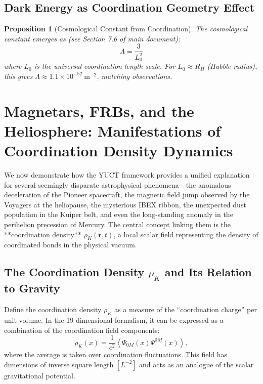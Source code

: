 \documentclass[12pt,a4paper]{article}
\newtheorem{proposition}[theorem]{Proposition}
\theoremstyle{remark}
\begin{document}
	\subsection{Dark Energy as Coordination Geometry Effect}
	
	\begin{proposition}[Cosmological Constant from Coordination]
		The cosmological constant emerges as (see Section 7.6 of main document):
		\[
		\Lambda = \frac{3}{L_0^2}
		\]
		where $L_0$ is the universal coordination length scale. For $L_0 \approx R_H$ (Hubble radius), this gives $\Lambda \approx 1.1 \times 10^{-52}\ \text{m}^{-2}$, matching observations.
	\end{proposition}
	
	\section{Magnetars, FRBs, and the Heliosphere: Manifestations of Coordination Density Dynamics}
	\label{sec:coord_density}
	
	We now demonstrate how the YUCT framework provides a unified explanation for several seemingly disparate astrophysical phenomena—the anomalous deceleration of the Pioneer spacecraft, the magnetic field jump observed by the Voyagers at the heliopause, the mysterious IBEX ribbon, the unexpected dust population in the Kuiper belt, and even the long-standing anomaly in the perihelion precession of Mercury. The central concept linking them is the **coordination density** \(\rho_K(\mathbf{r},t)\), a local scalar field representing the density of coordinated bonds in the physical vacuum.
	
	\subsection{The Coordination Density \(\rho_K\) and Its Relation to Gravity}
	\label{subsec:rho_K_definition}
	
	Define the coordination density \(\rho_K\) as a measure of the ``coordination charge'' per unit volume. In the 19-dimensional formalism, it can be expressed as a combination of the coordination field components:
	\begin{equation}
		\rho_K(x) = \frac{1}{c^2} \left\langle \Psi_{0M}(x) \Psi^{0M}(x) \right\rangle,
		\label{eq:coord:rho_K_def}
	\end{equation}
	where the average is taken over coordination fluctuations. This field has dimensions of inverse square length \([L^{-2}]\) and acts as an analogue of the scalar gravitational potential.
	
\end{document}
